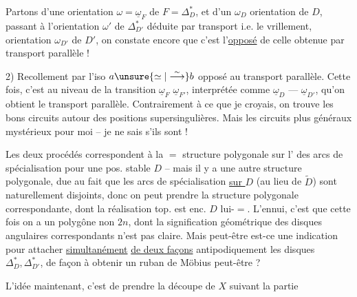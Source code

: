 Partons d'une orientation $\omega=\underline\omega_F$ de $F=\Delta_D^*$, et d'un $\omega_D$ orientation de $D$, passant à l'orientation $\omega'$ de $\Delta_{D'}^*$ déduite par transport i.e. le vrillement,  orientation $\omega_{D'}$ de $D'$, on constate encore que c'est l'\uline{opposé} de celle obtenue par transport parallèle !



2) Recollement par l'iso $a\unsure{\simeq|\overset{\sim}{\longrightarrow}}b$ opposé au transport parallèle. Cette fois, c'est au niveau de la transition $\underline\omega_F$ \unsure{---,|---|\ensuremath{\to}} $\underline\omega_{F'}$, interprétée comme $\underline\omega_D$ --- $\underline\omega_{D'}$, qu'on obtient le transport parallèle. Contrairement à ce que je croyais,  on trouve les bons circuits autour des positions supersingulières.
Mais les circuits plus généraux  mystérieux pour moi -- je ne sais s'ils sont  !

Les deux procédés correspondent à la $=$ structure polygonale sur l' des arcs de spécialisation  pour une pos. stable $D$ -- mais il y a une autre structure polygonale, due au fait que les  arcs de spécialisation \uline{sur $D$} (au lieu de $\widetilde D$) sont naturellement disjoints, donc on peut prendre la structure polygonale correspondante, dont la réalisation top. est enc. $D$ lui-$=$. L'ennui, c'est que cette fois on a un polygône   non $2n$,  dont la signification géométrique des disques angulaires correspondants n'est pas claire. Mais peut-être est-ce une indication pour attacher \uline{simultanément} \uline{de deux façons} antipodiquement les disques $\Delta^*_{D},\Delta^*_{D'}$, de façon à obtenir un ruban de Möbius peut-être ?

L'idée maintenant, c'est de prendre la découpe de $X$ suivant la partie

